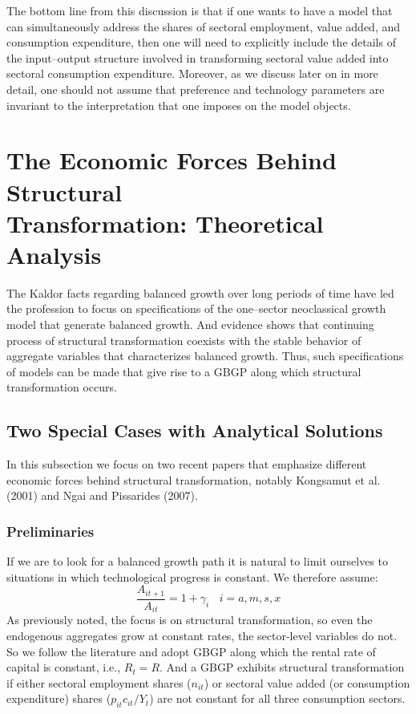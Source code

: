 \documentclass{article}
\begin{document}
    The bottom line from this discussion is that if one wants to have a model that can simultaneously address the shares of sectoral employment, value added, and consumption expenditure, then one will need to explicitly include the details of the input–output structure involved in transforming sectoral value added into sectoral consumption expenditure. Moreover, as we discuss later on in more detail, one should not assume that preference and technology parameters are invariant to the interpretation that one imposes on the model objects.

    \section{The Economic Forces Behind Structural\\ Transformation: Theoretical Analysis}
    The Kaldor facts regarding balanced growth over long periods of time have led the profession to focus on specifications of the one–sector neoclassical growth model that generate balanced growth. And evidence shows that continuing process of structural transformation coexists with the stable behavior of aggregate variables that characterizes balanced growth. Thus, such specifications of models can be made that give rise to a GBGP along which structural transformation occurs. 
    \subsection{Two Special Cases with Analytical Solutions}
    In this subsection we focus on two recent papers that emphasize different economic forces behind structural transformation, notably Kongsamut et al. (2001) and Ngai and Pissarides (2007).
    \subsubsection{Preliminaries}
    If we are to look for a balanced growth path it is natural to limit ourselves to situations in which technological progress is constant. We therefore assume:
    \begin{equation}
        \frac{A_{it+1}}{A_{it}}=1+\gamma_i\ \ \ \ i=a,m,s,x
    \end{equation}
    As previously noted, the focus is on structural transformation, so even the endogenous aggregates grow at constant rates, the sector-level variables do not. So we follow the literature and adopt GBGP along which the rental rate of capital is constant, i.e., $R_t=R$. And a GBGP exhibits structural transformation if either sectoral employment shares ($n_{it}$) or sectoral value added (or consumption expenditure) shares ($p_{it}c_{it}/Y_t$) are not constant for all three consumption sectors.
\end{document}
